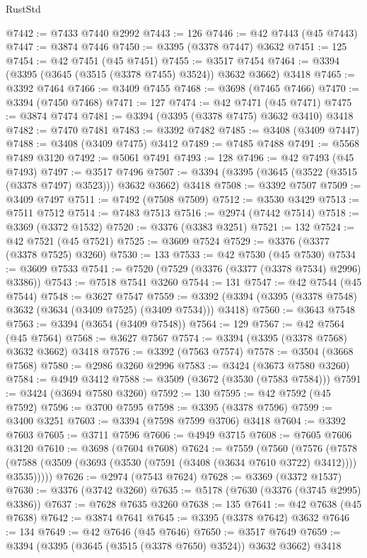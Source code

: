 \begin{lexlean}{RustStd}
\begin{coremodule}
@7442 := @7433 @7440 @2992
@7443 := 126
@7446 := @42 @7443 (@45 @7443)
@7447 := @3874 @7446
@7450 := @3395 (@3378 @7447) @3632
@7451 := 125
@7454 := @42 @7451 (@45 @7451)
@7455 := @3517 @7454
@7464 := @3394 (@3395 (@3645 (@3515 (@3378 @7455) @3524)) @3632 @3662) @3418
@7465 := @3392 @7464
@7466 := @3409 @7455
@7468 := @3698 (@7465 @7466)
@7470 := @3394 (@7450 @7468)
@7471 := 127
@7474 := @42 @7471 (@45 @7471)
@7475 := @3874 @7474
@7481 := @3394 (@3395 (@3378 @7475) @3632 @3410) @3418
@7482 := @7470 @7481
@7483 := @3392 @7482
@7485 := @3408 (@3409 @7447)
@7488 := @3408 (@3409 @7475) @3412
@7489 := @7485 @7488
@7491 := @5568 @7489 @3120
@7492 := @5061 @7491
@7493 := 128
@7496 := @42 @7493 (@45 @7493)
@7497 := @3517 @7496
@7507 := @3394 (@3395 (@3645 (@3522 (@3515 (@3378 @7497) @3523))) @3632 @3662) @3418
@7508 := @3392 @7507
@7509 := @3409 @7497
@7511 := @7492 (@7508 @7509)
@7512 := @3530 @3429
@7513 := @7511 @7512
@7514 := @7483 @7513
@7516 := @2974 (@7442 @7514)
@7518 := @3369 (@3372 @1532)
@7520 := @3376 (@3383 @3251)
@7521 := 132
@7524 := @42 @7521 (@45 @7521)
@7525 := @3609 @7524
@7529 := @3376 (@3377 (@3378 @7525) @3260)
@7530 := 133
@7533 := @42 @7530 (@45 @7530)
@7534 := @3609 @7533
@7541 := @7520 (@7529 (@3376 (@3377 (@3378 @7534) @2996) @3386))
@7543 := @7518 @7541 @3260
@7544 := 131
@7547 := @42 @7544 (@45 @7544)
@7548 := @3627 @7547
@7559 := @3392 (@3394 (@3395 (@3378 @7548) @3632 (@3634 (@3409 @7525) (@3409 @7534))) @3418)
@7560 := @3643 @7548
@7563 := @3394 (@3654 (@3409 @7548))
@7564 := 129
@7567 := @42 @7564 (@45 @7564)
@7568 := @3627 @7567
@7574 := @3394 (@3395 (@3378 @7568) @3632 @3662) @3418
@7576 := @3392 (@7563 @7574)
@7578 := @3504 (@3668 @7568)
@7580 := @2986 @3260 @2996
@7583 := @3424 (@3673 @7580 @3260)
@7584 := @4949 @3412
@7588 := @3509 (@3672 (@3530 (@7583 @7584)))
@7591 := @3424 (@3694 @7580 @3260)
@7592 := 130
@7595 := @42 @7592 (@45 @7592)
@7596 := @3700 @7595
@7598 := @3395 (@3378 @7596)
@7599 := @3400 @3251
@7603 := @3394 (@7598 @7599 @3706) @3418
@7604 := @3392 @7603
@7605 := @3711 @7596
@7606 := @4949 @3715
@7608 := @7605 @7606 @3120
@7610 := @3698 (@7604 @7608)
@7624 := @7559
    (@7560
      (@7576
        (@7578 (@7588 (@3509 (@3693 (@3530 (@7591 (@3408 (@3634 @7610 @3722) @3412)))) @3535)))))
@7626 := @2974 (@7543 @7624)
@7628 := @3369 (@3372 @1537)
@7630 := @3376 (@3742 @3260)
@7635 := @5178 (@7630 (@3376 (@3745 @2995) @3386))
@7637 := @7628 @7635 @3260
@7638 := 135
@7641 := @42 @7638 (@45 @7638)
@7642 := @3874 @7641
@7645 := @3395 (@3378 @7642) @3632
@7646 := 134
@7649 := @42 @7646 (@45 @7646)
@7650 := @3517 @7649
@7659 := @3394 (@3395 (@3645 (@3515 (@3378 @7650) @3524)) @3632 @3662) @3418

\end{coremodule}
\end{lexlean}
